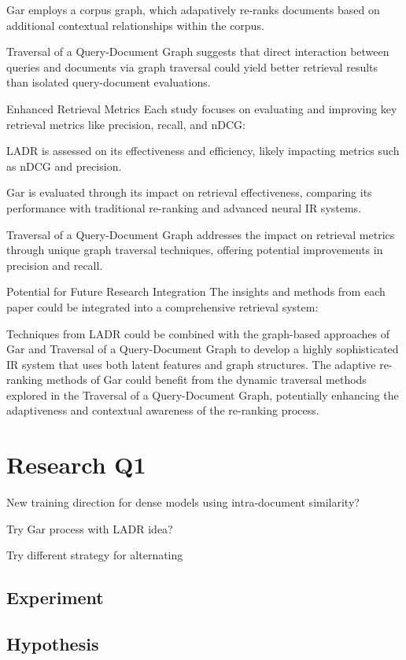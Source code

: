 \documentclass[sigconf,authorversion,nonacm]{acmart}
\begin{document}
Gar employs a corpus graph, which adapatively re-ranks documents based on additional
contextual relationships within the corpus.

Traversal of a Query-Document Graph suggests that direct interaction between queries and
documents via graph traversal could yield better retrieval results than isolated
query-document evaluations.

Enhanced Retrieval Metrics Each study focuses on evaluating and improving key retrieval
metrics like precision, recall, and nDCG:

LADR is assessed on its effectiveness and efficiency, likely impacting metrics such as nDCG
and precision.

Gar is evaluated through its impact on retrieval effectiveness, comparing its performance
with traditional re-ranking and advanced neural IR systems.

Traversal of a Query-Document Graph addresses the impact on retrieval metrics through unique
graph traversal techniques, offering potential improvements in precision and recall.

Potential for Future Research Integration The insights and methods from each paper could be
integrated into a comprehensive retrieval system:

Techniques from LADR could be combined with the graph-based approaches of Gar and Traversal
of a Query-Document Graph to develop a highly sophisticated IR system that uses both latent
features and graph structures. The adaptive re-ranking methods of Gar could benefit from the
dynamic traversal methods explored in the Traversal of a Query-Document Graph, potentially
enhancing the adaptiveness and contextual awareness of the re-ranking process.

\section{Research Q1}

New training direction for dense models using intra-document similarity?

Try Gar process with LADR idea?

Try different strategy for alternating
\subsection{Experiment}

\subsection{Hypothesis}
\end{document}
